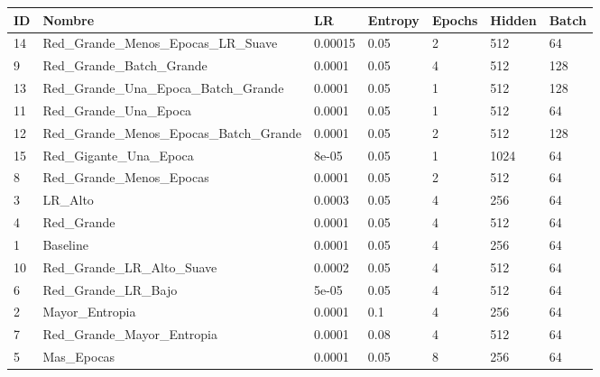 \begin{tabular}{lllllll}
\toprule
ID & Nombre & LR & Entropy & Epochs & Hidden & Batch \\
\midrule
14 & Red_Grande_Menos_Epocas_LR_Suave & 0.00015 & 0.05 & 2 & 512 & 64 \\
9 & Red_Grande_Batch_Grande & 0.0001 & 0.05 & 4 & 512 & 128 \\
13 & Red_Grande_Una_Epoca_Batch_Grande & 0.0001 & 0.05 & 1 & 512 & 128 \\
11 & Red_Grande_Una_Epoca & 0.0001 & 0.05 & 1 & 512 & 64 \\
12 & Red_Grande_Menos_Epocas_Batch_Grande & 0.0001 & 0.05 & 2 & 512 & 128 \\
15 & Red_Gigante_Una_Epoca & 8e-05 & 0.05 & 1 & 1024 & 64 \\
8 & Red_Grande_Menos_Epocas & 0.0001 & 0.05 & 2 & 512 & 64 \\
3 & LR_Alto & 0.0003 & 0.05 & 4 & 256 & 64 \\
4 & Red_Grande & 0.0001 & 0.05 & 4 & 512 & 64 \\
1 & Baseline & 0.0001 & 0.05 & 4 & 256 & 64 \\
10 & Red_Grande_LR_Alto_Suave & 0.0002 & 0.05 & 4 & 512 & 64 \\
6 & Red_Grande_LR_Bajo & 5e-05 & 0.05 & 4 & 512 & 64 \\
2 & Mayor_Entropia & 0.0001 & 0.1 & 4 & 256 & 64 \\
7 & Red_Grande_Mayor_Entropia & 0.0001 & 0.08 & 4 & 512 & 64 \\
5 & Mas_Epocas & 0.0001 & 0.05 & 8 & 256 & 64 \\
\bottomrule
\end{tabular}
